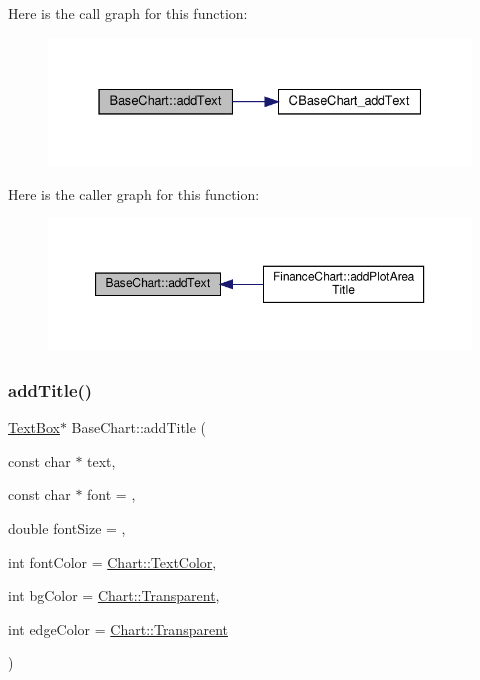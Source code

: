 Here is the call graph for this function\+:
\nopagebreak
\begin{figure}[H]
\begin{center}
\leavevmode
\includegraphics[width=331pt]{class_base_chart_a2a2016142a7036736cc0c3ffd43a5d80_cgraph}
\end{center}
\end{figure}
Here is the caller graph for this function\+:
\nopagebreak
\begin{figure}[H]
\begin{center}
\leavevmode
\includegraphics[width=350pt]{class_base_chart_a2a2016142a7036736cc0c3ffd43a5d80_icgraph}
\end{center}
\end{figure}
\mbox{\label{class_base_chart_a06e200a95fd2a9c00522b896a6ff5dc5}} 
\subsubsection{\texorpdfstring{add\+Title()}{addTitle()}\hspace{0.1cm}{\footnotesize\ttfamily [1/2]}}
{\footnotesize\ttfamily \hyperlink{class_text_box}{Text\+Box}$\ast$ Base\+Chart\+::add\+Title (\begin{DoxyParamCaption}\item[{const char $\ast$}]{text,  }\item[{const char $\ast$}]{font = {},  }\item[{double}]{font\+Size = {},  }\item[{int}]{font\+Color = {\ttfamily \hyperlink{namespace_chart_abee0d882fdc9ad0b001245ad9fc64011a879e14f2f5024caccc047374342321ef}{Chart\+::\+Text\+Color}},  }\item[{int}]{bg\+Color = {\ttfamily \hyperlink{namespace_chart_abee0d882fdc9ad0b001245ad9fc64011afc6811800a9e2582dac0157b6279f836}{Chart\+::\+Transparent}},  }\item[{int}]{edge\+Color = {\ttfamily \hyperlink{namespace_chart_abee0d882fdc9ad0b001245ad9fc64011afc6811800a9e2582dac0157b6279f836}{Chart\+::\+Transparent}} }\end{DoxyParamCaption})\hspace{0.3cm}{\ttfamily [inline]}}



